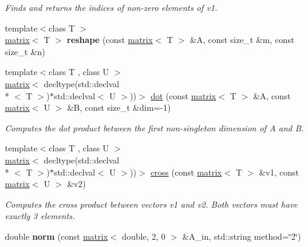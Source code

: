 \begin{DoxyCompactItemize}
\begin{DoxyCompactList}\small\item\em Finds and returns the indices of non-\/zero elements of v1. \end{DoxyCompactList}\item 
\hypertarget{namespacekeycpp_a8e6462a878df6e022bd4f9aa6f953983}{{\footnotesize template$<$class T $>$ }\\\hyperlink{classkeycpp_1_1matrix}{matrix}$<$ T $>$ {\bfseries reshape} (const \hyperlink{classkeycpp_1_1matrix}{matrix}$<$ T $>$ \&A, const size\-\_\-t \&m, const size\-\_\-t \&n)}\label{namespacekeycpp_a8e6462a878df6e022bd4f9aa6f953983}

\item 
\hypertarget{namespacekeycpp_a67c6ec70ba46d1d830acf7fbf8b8b97e}{{\footnotesize template$<$class T , class U $>$ }\\\hyperlink{classkeycpp_1_1matrix}{matrix}$<$ decltype(std\-::declval\\*
$<$ T $>$)$\ast$std\-::declval$<$ U $>$))$>$ \hyperlink{namespacekeycpp_a67c6ec70ba46d1d830acf7fbf8b8b97e}{dot} (const \hyperlink{classkeycpp_1_1matrix}{matrix}$<$ T $>$ \&A, const \hyperlink{classkeycpp_1_1matrix}{matrix}$<$ U $>$ \&B, const size\-\_\-t \&dim=-\/1)}\label{namespacekeycpp_a67c6ec70ba46d1d830acf7fbf8b8b97e}

\begin{DoxyCompactList}\small\item\em Computes the dot product between the first non-\/singleton dimension of A and B. \end{DoxyCompactList}\item 
\hypertarget{namespacekeycpp_a157ec9804a57367b3153fb3cc81f9224}{{\footnotesize template$<$class T , class U $>$ }\\\hyperlink{classkeycpp_1_1matrix}{matrix}$<$ decltype(std\-::declval\\*
$<$ T $>$)$\ast$std\-::declval$<$ U $>$))$>$ \hyperlink{namespacekeycpp_a157ec9804a57367b3153fb3cc81f9224}{cross} (const \hyperlink{classkeycpp_1_1matrix}{matrix}$<$ T $>$ \&v1, const \hyperlink{classkeycpp_1_1matrix}{matrix}$<$ U $>$ \&v2)}\label{namespacekeycpp_a157ec9804a57367b3153fb3cc81f9224}

\begin{DoxyCompactList}\small\item\em Computes the cross product between vectors v1 and v2. Both vectors must have exactly 3 elements. \end{DoxyCompactList}\item 
\hypertarget{namespacekeycpp_af6ba102c379ceaa8bfa814ecfa095a56}{double {\bfseries norm} (const \hyperlink{classkeycpp_1_1matrix}{matrix}$<$ double, 2, 0 $>$ \&A\-\_\-in, std\-::string method=\char`\"{}2\char`\"{})}\label{namespacekeycpp_af6ba102c379ceaa8bfa814ecfa095a56}


\end{DoxyCompactItemize}
